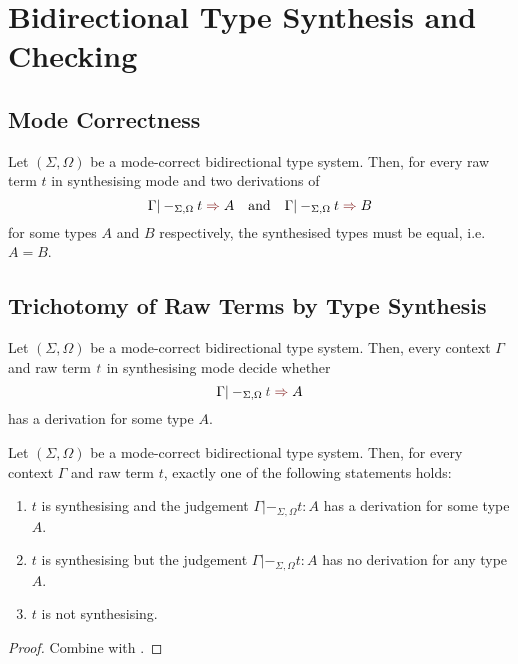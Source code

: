 
\section{Bidirectional Type Synthesis and Checking} \label{sec:type-synthesis}

\subsection{Mode Correctness}
\begin{definition}
\end{definition}


\begin{theorem}\label{thm:unique-syn}
  Let $(\Sigma, \Omega)$ be a mode-correct bidirectional type system.
  Then, for every raw term $t$ in synthesising mode and two derivations of 
  \[
    \Gamma |-_{\Sigma, \Omega} t \syn A
    \quad\text{and}\quad
    \Gamma |-_{\Sigma, \Omega} t \syn B
  \]
  for some types $A$ and $B$ respectively, the synthesised types must be equal, i.e.\ $A = B$.
\end{theorem}
 

\subsection{Trichotomy of Raw Terms by Type Synthesis}

\begin{theorem} \label{thm:bidirectional-type-synthesis}
  Let $(\Sigma, \Omega)$ be a mode-correct bidirectional type system.
  Then, every context $\Gamma$ and raw term $\isTerm{t}$ in synthesising mode decide whether
  \[
    \Gamma |-_{\Sigma, \Omega} \isTerm{t} \syn A
  \]
  has a derivation for some type $A$.
\end{theorem}

\begin{corollary}
  Let $(\Sigma, \Omega)$ be a mode-correct bidirectional type system.
  Then, for every context $\Gamma$ and raw term $t$, exactly one of the following statements holds:
  \begin{enumerate}
    \item $t$ is synthesising and the judgement $\Gamma |-_{\Sigma, \Omega} t : A$ has a derivation for some type $A$.
    \item $t$ is synthesising but the judgement $\Gamma |-_{\Sigma, \Omega} t : A$ has no derivation for any type $A$.
    \item $t$ is not synthesising.
  \end{enumerate}
\end{corollary}
\begin{proof}
  Combine   with .
  
\end{proof}

